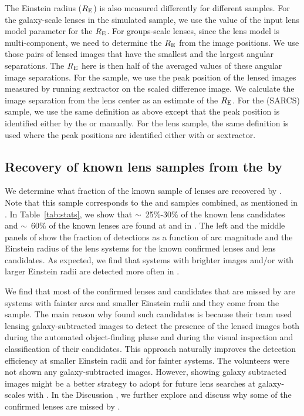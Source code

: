 \documentclass[useAMS,usenatbib,a4paper]{mn2e}
\begin{document}
The Einstein radius ($R_{\rm E}$) is also measured differently for
different samples. For the galaxy-scale lenses in the simulated sample,
we use the value of the input lens model parameter for the $R_{\rm E}$.
For groups-scale lenses, since the lens model is multi-component, we
need to determine the $R_{\rm E}$ from the image positions. We use those
pairs of lensed images that have the smallest and the largest angular
separations. The $R_{\rm E}$ here is then half of the averaged values of
these angular image separations.  For the \rf sample, we use the peak
position of the lensed images measured by running {\sc sextractor} on
the scaled difference image. We calculate the image separation from the
lens center as an estimate of the $R_{\rm E}$. For the \af (SARCS)
sample, we use the same definition as above except that the peak
position is identified either by the \af or manually. For the \sw lens
sample, the same definition is used where the peak positions are
identified either with \af or {\sc sextractor}.



\subsection{Recovery of known lens samples from the \cfhtls by \sw}
\label{sec:results:known}

We determine what fraction of the known sample of lenses are recovered
by \sw. Note that this sample corresponds to the \rf and \af samples
combined, as mentioned in . In Table~\ref{tab:stats},
we show that $\sim$~25\%-30\% of the known lens candidates and
$\sim$~60\% of the known lenses are found at \StageOne and \StageTwo in
\sw. The left and the middle panels of  show the
fraction of detections as a function of arc magnitude and the Einstein
radius of the lens systems for the known confirmed lenses and lens
candidates. As expected, we find that systems with brighter images
and/or with larger Einstein radii are detected more often in \sw.

We find that most of the confirmed lenses and candidates that are missed
by \sw are systems with fainter arcs and smaller Einstein radii and they
come from the \rf sample. The main reason why \rf found such candidates
is because their team used lensing galaxy-subtracted images to detect
the presence of the lensed images both during the automated
object-finding phase and during the visual inspection and classification
of their candidates. This approach naturally improves the detection
efficiency at smaller Einstein radii and for fainter systems. The \sw
volunteers were not shown any galaxy-subtracted images. However, showing
galaxy subtracted images might be a better strategy to adopt for future
lens searches at galaxy-scales with \sw. In the Discussion
, we further explore and discuss why some of the confirmed
lenses are missed by \sw.
\end{document}
